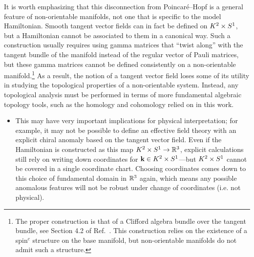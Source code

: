 It is worth emphasizing that this disconnection from Poincaré--Hopf is a general feature of non-orientable manifolds, not one that is specific to the model Hamiltonian. Smooth tangent vector fields can in fact be defined on $K^2\times S^1$, but a Hamiltonian cannot be associated to them in a canonical way. Such a construction usually requires using gamma matrices that ``twist along'' with the tangent bundle of the manifold instead of the regular vector of Pauli matrices, but these gamma matrices cannot be defined consistently on a non-orientable manifold.\footnote{
	The proper construction is that of a Clifford algebra bundle over the tangent bundle, see Section 4.2 of Ref.~\cite{Mathai_math-review}. This construction relies on the existence of a spin$^c$ structure on the base manifold, but non-orientable manifolds do not admit such a structure. } %
As a result, the notion of a tangent vector field loses some of its utility in studying the topological properties of a non-orientable system. Instead, any topological analysis must be performed in terms of more fundamental algebraic topology tools, such as the homology and cohomology relied on in this work.

{\color{blue}
\begin{itemize} %
	\item This may have very important implications for physical interpretation; for example, it may not be possible to define an effective field theory with an explicit chiral anomaly based on the tangent vector field. Even if the Hamiltonian is constructed as this map $K^2\times S^1\to\mathbb{R}^3$, explicit calculations still rely on writing down coordinates for $\vb{k}\in K^2\times S^1$---but $K^2\times S^1$ cannot be covered in a single coordinate chart. Choosing coordinates comes down to this choice of fundamental domain in $\mathbb{R}^3$ again, which means any possible anomalous features will not be robust under change of coordinates (i.e. not physical).
\end{itemize}
}


